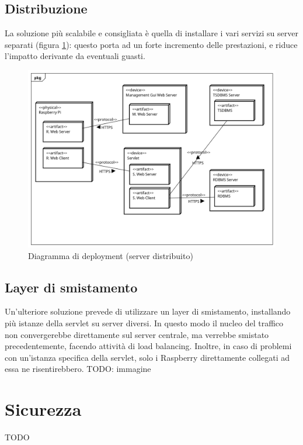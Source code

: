\subsection{Distribuzione}
La soluzione più scalabile e consigliata è quella di installare i vari servizi su server separati (figura \ref{DD DIST}): questo porta ad un forte incremento delle prestazioni, e riduce l'impatto derivante da eventuali guasti.
\begin{figure}[tbp]
	\centering
	\includegraphics[scale=.45]{figure/Deployment_Diagram_1.png}
	\caption{Diagramma di deployment (server distribuito) \label{DD DIST}}
\end{figure}
\subsection{Layer di smistamento}
Un'ulteriore soluzione prevede di utilizzare un layer di smistamento, installando più istanze della servlet su server diversi. In questo modo il nucleo del traffico non convergerebbe direttamente sul server centrale, ma verrebbe smistato precedentemente, facendo attività di load balancing. Inoltre, in caso di problemi con un'istanza specifica della servlet, solo i Raspberry direttamente collegati ad essa ne risentirebbero.
TODO: immagine


\section{Sicurezza}
TODO